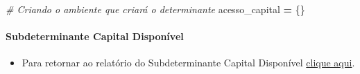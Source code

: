 \documentclass[
  12,
  dvipsnames]{article}
\newenvironment{Shaded}{\begin{snugshade}}{\end{snugshade}}
\newcommand{\CommentTok}[1]{\textcolor[rgb]{0.56,0.35,0.01}{\textit{#1}}}
\newcommand{\NormalTok}[1]{#1}
\newcommand{\OperatorTok}[1]{\textcolor[rgb]{0.81,0.36,0.00}{\textbf{#1}}}
\providecommand{\tightlist}{%
  \setlength{\itemsep}{0pt}\setlength{\parskip}{0pt}}
\begin{document}
\begin{Shaded}
\begin{Highlighting}[]
\CommentTok{\# Criando o ambiente que criará o determinante}
\NormalTok{acesso\_capital }\OperatorTok{=}\NormalTok{ \{\}}
\end{Highlighting}
\end{Shaded}

\hypertarget{script_2.4.1}{%
\paragraph*{Subdeterminante Capital Disponível}\label{script_2.4.1}}

\begin{itemize}
\tightlist
\item
  Para retornar ao relatório do Subdeterminante Capital Disponível
  \protect\hyperlink{subdet_cap_disp}{clique aqui}.
\end{itemize}
\end{document}
